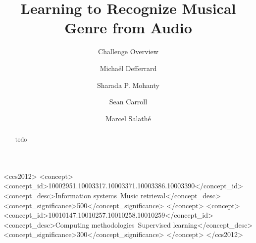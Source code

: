 \documentclass[sigconf]{acmart}
\begin{document}
\title{Learning to Recognize Musical Genre from Audio}
\subtitle{Challenge Overview}


\author{Michaël Defferrard}

\author{Sharada P. Mohanty}

\author{Sean Carroll}

\author{Marcel Salathé}



\begin{abstract}
	todo
\end{abstract}


 \begin{CCSXML}
<ccs2012>
  <concept>
    <concept_id>10002951.10003317.10003371.10003386.10003390</concept_id>
    <concept_desc>Information systems~Music retrieval</concept_desc>
    <concept_significance>500</concept_significance>
  </concept>
  <concept>
    <concept_id>10010147.10010257.10010258.10010259</concept_id>
    <concept_desc>Computing methodologies~Supervised learning</concept_desc>
    <concept_significance>300</concept_significance>
  </concept>
</ccs2012>
\end{CCSXML}

\end{document}

